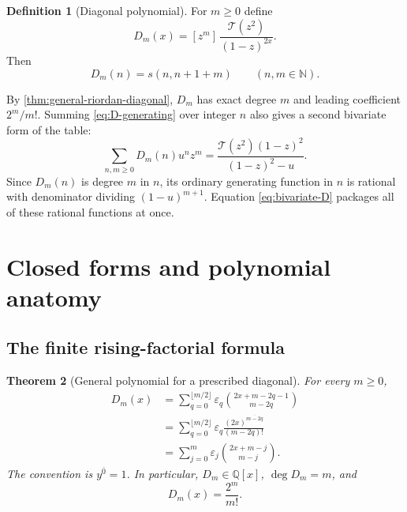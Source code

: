 \documentclass[11pt,oneside]{article}
\newtheorem{theorem}{Theorem}[section]
\theoremstyle{definition}
\newtheorem{definition}[theorem]{Definition}
\theoremstyle{remark}
\newcommand{\N}{\mathbb N}
\newcommand{\Q}{\mathbb Q}
\newcommand{\eps}{\varepsilon}
\newcommand{\Diag}{D}
\newcommand{\TM}{\mathcal T}
\newcommand{\coeff}[2]{[z^{#1}]\,#2}
\newcommand{\rising}[2]{#1^{\overline{#2}}}
\begin{document}
\begin{definition}[Diagonal polynomial]
\label{def:Dm}
For $m\ge0$ define
\begin{equation}
 \boxed{\quad
 \Diag_m(x)=\coeff{m}{\frac{\TM(z^2)}{(1-z)^{2x}}}.
 \quad}
 \label{eq:D-generating}
\end{equation}
Then
\begin{equation}
 \Diag_m(n)=s(n,n+1+m)
 \qquad(n,m\in\N).
 \label{eq:D-table}
\end{equation}
\end{definition}

By \cref{thm:general-riordan-diagonal}, $\Diag_m$ has exact degree $m$ and
leading coefficient $2^m/m!$.  Summing \eqref{eq:D-generating} over integer
$n$ also gives a second bivariate form of the table:
\begin{equation}
 \sum_{n,m\ge0}\Diag_m(n)u^nz^m
 =\frac{\TM(z^2)(1-z)^2}{(1-z)^2-u}.
 \label{eq:bivariate-D}
\end{equation}
Since $\Diag_m(n)$ is degree $m$ in $n$, its ordinary generating function in
$n$ is rational with denominator dividing $(1-u)^{m+1}$.  Equation
\eqref{eq:bivariate-D} packages all of these rational functions at once.

\section{Closed forms and polynomial anatomy}
\label{sec:closed}

\subsection{The finite rising-factorial formula}

\begin{theorem}[General polynomial for a prescribed diagonal]
\label{thm:main-polynomial}
For every $m\ge0$,
\begin{align}
 \Diag_m(x)
 &=\sum_{q=0}^{\lfloor m/2\rfloor}
   \eps_q\binom{2x+m-2q-1}{m-2q}
 \label{eq:D-binomial-even}\\
 &=\sum_{q=0}^{\lfloor m/2\rfloor}
   \eps_q\frac{\rising{(2x)}{m-2q}}{(m-2q)!}
 \label{eq:D-rising}\\
 &=\sum_{j=0}^{m}
   \eps_j\binom{2x+m-j}{m-j}.
 \label{eq:D-binomial-all}
\end{align}
The convention is $\rising{y}{0}=1$.  In particular,
$\Diag_m\in\Q[x]$, $\deg\Diag_m=m$, and
\begin{equation}
 [x^m]\Diag_m(x)=\frac{2^m}{m!}.
 \label{eq:D-leading}
\end{equation}
\end{theorem}
\end{document}

